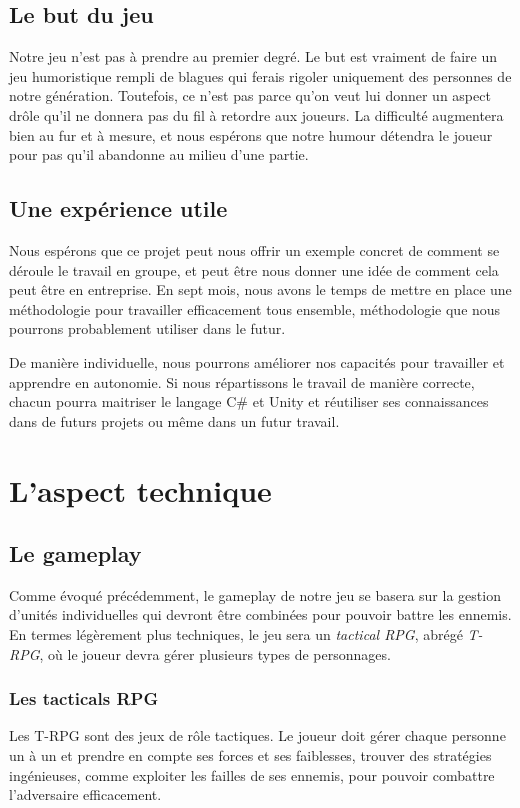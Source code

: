 \documentclass{article}
\begin{document}
\subsection{Le but du jeu}
Notre jeu n'est pas à prendre au premier degré. Le but est vraiment de faire un jeu humoristique rempli de blagues qui ferais rigoler uniquement des personnes de notre génération. Toutefois, ce n'est pas parce qu'on veut lui donner un aspect drôle qu'il ne donnera pas du fil à retordre aux joueurs. La difficulté augmentera bien au fur et à mesure, et nous espérons que notre humour détendra le joueur pour pas qu'il abandonne au milieu d'une partie.

\subsection{Une expérience utile}
Nous espérons que ce projet peut nous offrir un exemple concret de comment se déroule le travail en groupe, et peut être nous donner une idée de comment cela peut être en entreprise. En sept mois, nous avons le temps de mettre en place une méthodologie pour travailler efficacement tous ensemble, méthodologie que nous pourrons probablement utiliser dans le futur.

De manière individuelle, nous pourrons améliorer nos capacités pour travailler et apprendre en autonomie. Si nous répartissons le travail de manière correcte, chacun pourra maitriser le langage C\# et Unity et réutiliser ses connaissances dans de futurs projets ou même dans un futur travail.

\section{L'aspect technique}
\subsection{Le gameplay}
Comme évoqué précédemment, le gameplay de notre jeu se basera sur la gestion d'unités individuelles qui devront être combinées pour pouvoir battre les ennemis. En termes légèrement plus techniques, le jeu sera un \textit{tactical RPG}, abrégé \textit{T-RPG}, où le joueur devra gérer plusieurs types de personnages.

\subsubsection{Les tacticals RPG}
Les T-RPG sont des jeux de rôle tactiques. Le joueur doit gérer chaque personne un à un et prendre en compte ses forces et ses faiblesses, trouver des stratégies ingénieuses, comme exploiter les failles de ses ennemis, pour pouvoir combattre l'adversaire efficacement.\\
\end{document}
